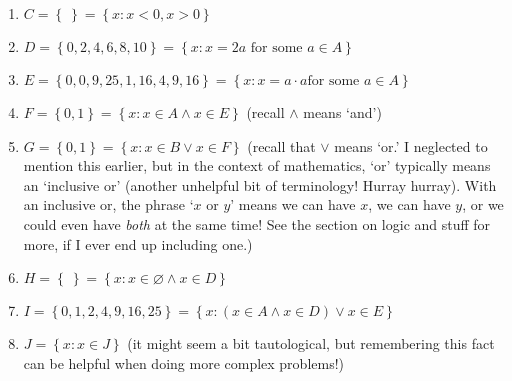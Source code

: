 \documentclass[10pt]{article}
\theoremstyle{definition}
\newcommand{\set}[1]{\left\{ #1 \right\}}
\begin{document}
{\begin{enumerate}
    \item $C = \set{~} = \set{x:x<0,x>0}$
    \item $D = \set{0,2,4,6,8,10} = \set{x:x=2a\text{ for some }a\in
        A}$
    \item $E = \set{0,0,9,25,1,16,4,9,16} = \set{x:x=a\cdot a \text{
          for some }a\in A}$
    \item $F = \set{0,1} = \set{x:x\in A \land x\in E}$ (recall
      $\land$ means `and')
    \item $G = \set{0,1} = \set{x:x\in B \lor x\in F}$ (recall that
      $\lor$ means `or.'  I neglected to mention this earlier, but in
      the context of mathematics, `or' typically means an `inclusive
      or' (another unhelpful bit of terminology! Hurray hurray).  With
      an inclusive or, the phrase `$x$ or $y$' means we can have $x$,
      we can have $y$, or we could even have \emph{both} at the same
      time!  See the section on logic and stuff for more, if I ever
      end up including one.)
    \item $H = \set{~} = \set{x:x\in \varnothing\land x\in D}$
    \item $I = \set{0,1,2,4,9,16,25} = \set{x:(x\in A\land x\in D)\lor x\in E}$
    \item $J = \set{x:x\in J}$ (it might seem a bit tautological, but
      remembering this fact can be helpful when doing more complex
      problems!)
\end{enumerate}
}
\end{document}
